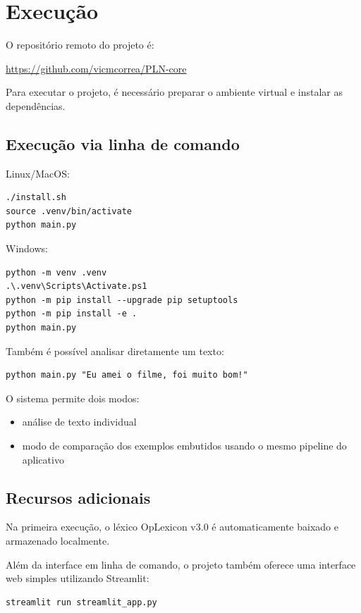 \documentclass[11pt,a4paper]{article}
\begin{document}
\section{Execução}

O repositório remoto do projeto é:

\url{https://github.com/vicmcorrea/PLN-core}

Para executar o projeto, é necessário preparar o ambiente virtual e instalar as dependências.

\subsection*{Execução via linha de comando}

Linux/MacOS:
\begin{verbatim}
./install.sh
source .venv/bin/activate
python main.py
\end{verbatim}

Windows:
\begin{verbatim}
python -m venv .venv
.\.venv\Scripts\Activate.ps1
python -m pip install --upgrade pip setuptools
python -m pip install -e .
python main.py
\end{verbatim}

Também é possível analisar diretamente um texto:

\begin{verbatim}
python main.py "Eu amei o filme, foi muito bom!"
\end{verbatim}

O sistema permite dois modos:
\begin{itemize}
  \item análise de texto individual
  \item modo de comparação dos exemplos embutidos usando o mesmo pipeline do aplicativo
\end{itemize}

\subsection*{Recursos adicionais}

Na primeira execução, o léxico OpLexicon v3.0 é automaticamente baixado e armazenado localmente.

Além da interface em linha de comando, o projeto também oferece uma interface web simples utilizando Streamlit:

\begin{verbatim}
streamlit run streamlit_app.py
\end{verbatim}
\end{document}
